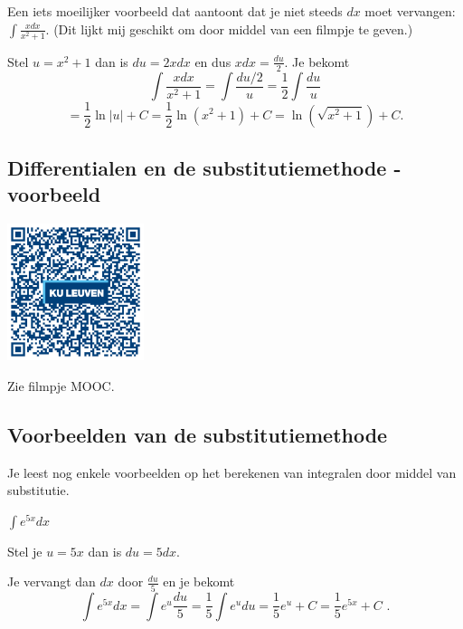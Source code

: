 \begin{voorbeeld}
	Een iets moeilijker voorbeeld dat aantoont dat je niet steeds $dx$ moet vervangen: $\int \frac{xdx}{x^2+1}$.
\noindent (Dit lijkt mij geschikt om door middel van een filmpje te geven.)

Stel $u=x^2+1$ dan is $du=2xdx$ en dus $xdx=\frac{du}{2}$.
Je bekomt
\[
\int \frac{xdx}{x^2+1}=\int \frac{du/2}{u}=\frac{1}{2} \int \frac{du}{u}
\]
\[
=\frac{1}{2} \ln \vert u \vert +C=\frac{1}{2} \ln \left( x^2+1 \right)+C=\ln \left( \sqrt{x^2+1} \right)+C \text {.}
\]


\end{voorbeeld}

\subsection{Differentialen en de substitutiemethode - voorbeeld}
\begin{minipage}{.25\linewidth}
	\raggedright
	\includegraphics[width=4cm]{6_afgeleiden_integralen/inputs/QR_Code_DIFFSUBSTVB_module6_3new}
\end{minipage}
\begin{minipage}{.7\linewidth}
	Zie filmpje MOOC.
\end{minipage}

\subsection{Voorbeelden van de substitutiemethode}

Je leest nog enkele voorbeelden op het berekenen van integralen door middel van substitutie.

\vspace{2mm}

\begin{voorbeeld}
	$\int e^{5x}dx$
	
	Stel je $u=5x$ dan is $du=5dx$.
	
	Je vervangt dan $dx$ door $\frac{du}{5}$ en je bekomt
	\[
	\int e^{5x}dx=\int e^u\frac{du}{5}=\frac{1}{5} \int e^udu=\frac{1}{5} e^u+C=\frac{1}{5}e^{5x}+C \text { .}
	\]
	
\end{voorbeeld}

